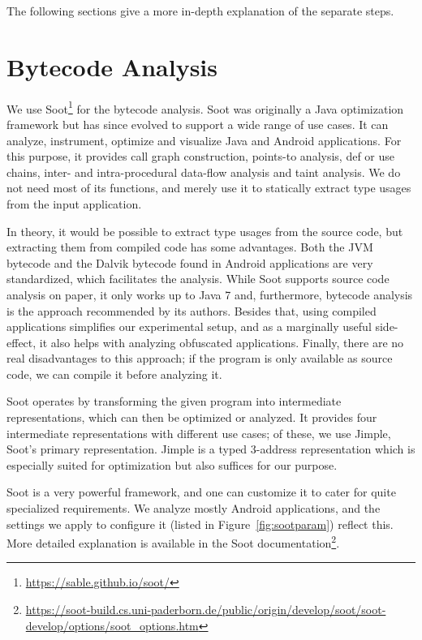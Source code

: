 The following sections give a more in-depth explanation of the separate steps.

\section{Bytecode Analysis}\label{sec:bytecode}

We use Soot\footnote{\url{https://sable.github.io/soot/}} for the bytecode analysis.
Soot was originally a Java optimization framework but has since evolved to support a wide range of use cases.
It can analyze, instrument, optimize and visualize Java and Android applications.
For this purpose, it provides call graph construction, points-to analysis, def or use chains, inter- and intra-procedural data-flow analysis and taint analysis.
We do not need most of its functions, and merely use it to statically extract type usages from the input application.

In theory, it would be possible to extract type usages from the source code, but extracting them from compiled code has some advantages.
Both the JVM bytecode and the Dalvik bytecode found in Android applications are very standardized, which facilitates the analysis.
While Soot supports source code analysis on paper, it only works up to Java 7 and, furthermore, bytecode analysis is the approach recommended by its authors.
Besides that, using compiled applications simplifies our experimental setup, and as a marginally useful side-effect, it also helps with analyzing obfuscated applications.
Finally, there are no real disadvantages to this approach; if the program is only available as source code, we can compile it before analyzing it.

Soot operates by transforming the given program into intermediate representations, which can then be optimized or analyzed.
It provides four intermediate representations with different use cases; of these, we use Jimple, Soot's primary representation.
Jimple is a typed 3-address representation which is especially suited for optimization but also suffices for our purpose.

Soot is a very powerful framework, and one can customize it to cater for quite specialized requirements.
We analyze mostly Android applications, and the settings we apply to configure it (listed in Figure~\ref{fig:sootparam}) reflect this.
More detailed explanation is available in the Soot documentation\footnote{\url{https://soot-build.cs.uni-paderborn.de/public/origin/develop/soot/soot-develop/options/soot_options.htm}}.

